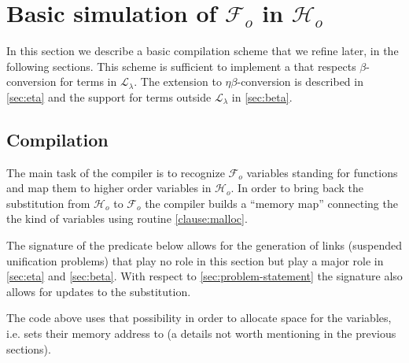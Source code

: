 \documentclass[sigconf,natbib=false,review]{acmart}
\newcommand{\llambda}{\ensuremath{\mathcal{L}_\lambda}\xspace}
\newcommand{\Fo}{\ensuremath{\mathcal{F}_{\!o}\xspace}} %
\newcommand{\Ho}{\ensuremath{\mathcal{H}_o}\xspace}
\begin{document}


\section[Compilation: fo\_tm to tm]{Basic simulation of \Fo{} in \Ho{}}
\label{sec:simulation}

In this section we describe a basic compilation scheme that we refine
later, in the following sections. This scheme is sufficient to implement
a \hstep that respects $\beta$-conversion for terms in \llambda.
The extension to $\eta\beta$-conversion is described in \cref{sec:eta} and
the support for terms outside \llambda in \cref{sec:beta}.

\subsection{Compilation}
\label{sec:compilation}

The main task of the compiler is to recognize \Fo{} variables standing
for functions and map them to higher order variables in \Ho.
In order to bring back the substitution from \Ho{} to \Fo{} the compiler
builds a ``memory map'' connecting the the kind of variables using routine
\ref{clause:malloc}.

The signature of the  predicate below allows for the generation of
links (suspended unification problems) that play no role in this section
but play a major role in \cref{sec:eta} and \cref{sec:beta}.
With respect to \cref{sec:problem-statement} the signature also allows
for updates to the substitution.



\noindent
The code above uses that possibility
in order to allocate space for the variables, i.e. sets their memory
address to  (a details not worth mentioning in the
previous sections).
\end{document}
